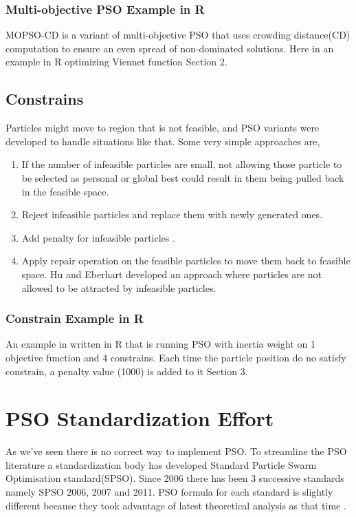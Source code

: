 \documentclass{article}
\begin{document}
\subsubsection{Multi-objective PSO Example in R}
MOPSO-CD is a variant of multi-objective PSO that uses crowding distance(CD) computation to ensure an even spread of non-dominated solutions. Here in an example in R optimizing Viennet  function\cite{irfan_2021R} Section 2.

\subsection{Constrains}
Particles might move to region that is not feasible, and PSO variants were developed to handle situations like that. Some very simple approaches are, 
\begin{enumerate}
    \item If the number of infeasible particles are small, not allowing those  particle to be selected as personal or global best could result in them being pulled back in the feasible space.
    \item Reject infeasible particles and replace them with newly generated ones.
    \item Add penalty for infeasible particles \cite{parsopoulos2002particle}. 
    \item Apply repair operation on the feasible particles to move them back to feasible space. Hu and Eberhart developed an approach where particles are not allowed to be attracted by infeasible particles. \cite{hu2002solving}
\end{enumerate}

\subsubsection{Constrain Example in R}
An example in written in R that is running PSO with inertia weight on 1 objective function and 4 constrains. Each time the particle position do no satisfy constrain, a penalty value (1000) is added to it \cite{irfan_2021R} Section 3.

\section{PSO Standardization Effort}
As we've seen there is no correct way to implement PSO. To streamline the PSO literature a standardization body has developed Standard Particle Swarm Optimisation standard(SPSO). Since 2006 there has been 3 successive standards namely SPSO 2006, 2007 and 2011. PSO formula for each standard is slightly different because they took advantage of latest theoretical analysis as that time \cite{clerc:hal-00764996}.
\end{document}
